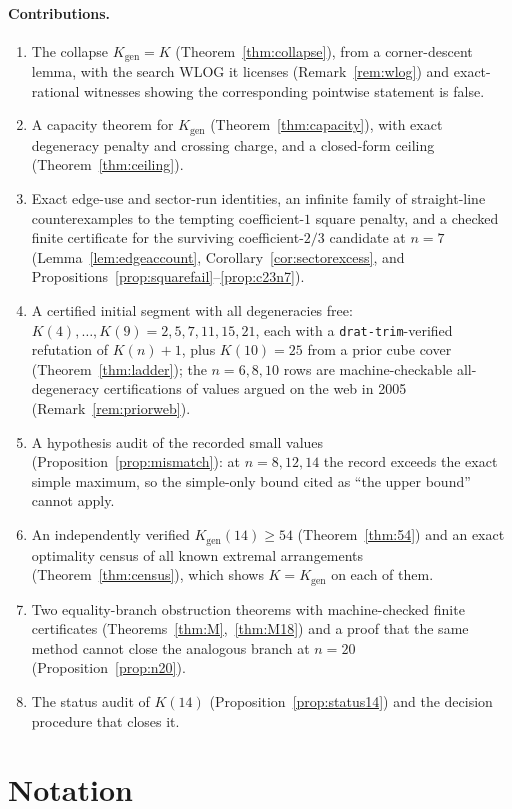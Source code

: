 \documentclass[11pt]{article}
\theoremstyle{definition}
\newcommand{\Kgen}{K_{\mathrm{gen}}}
\begin{document}
\paragraph{Contributions.}
\begin{enumerate}
\item The collapse $\Kgen=K$ (Theorem~\ref{thm:collapse}), from a
corner-descent lemma, with the search WLOG it licenses
(Remark~\ref{rem:wlog}) and exact-rational witnesses showing the
corresponding pointwise statement is false.
\item A capacity theorem for $\Kgen$ (Theorem~\ref{thm:capacity}), with exact
degeneracy penalty and crossing charge, and a closed-form ceiling
(Theorem~\ref{thm:ceiling}).
\item Exact edge-use and sector-run identities, an infinite family of
straight-line counterexamples to the tempting coefficient-$1$ square penalty,
and a checked finite certificate for the surviving coefficient-$2/3$
candidate at $n=7$ (Lemma~\ref{lem:edgeaccount},
Corollary~\ref{cor:sectorexcess}, and
Propositions~\ref{prop:squarefail}--\ref{prop:c23n7}).
\item A certified initial segment with all degeneracies free:
$K(4),\dots,K(9)=2,5,7,11,15,21$, each with a \texttt{drat-trim}-verified
refutation of $K(n)+1$, plus $K(10)=25$ from a prior cube cover
(Theorem~\ref{thm:ladder}); the $n=6,8,10$ rows are machine-checkable
all-degeneracy certifications of values argued on the web in 2005
(Remark~\ref{rem:priorweb}).
\item A hypothesis audit of the recorded small values
(Proposition~\ref{prop:mismatch}): at $n=8,12,14$ the record exceeds the
exact simple maximum, so the simple-only bound cited as ``the upper bound''
cannot apply.
\item An independently verified $\Kgen(14)\ge54$ (Theorem~\ref{thm:54}) and
an exact optimality census of all known extremal arrangements
(Theorem~\ref{thm:census}), which shows $K=\Kgen$ on each of them.
\item Two equality-branch obstruction theorems with machine-checked finite
certificates (Theorems~\ref{thm:M},~\ref{thm:M18}) and a proof that the same
method cannot close the analogous branch at $n=20$
(Proposition~\ref{prop:n20}).
\item The status audit of $K(14)$ (Proposition~\ref{prop:status14}) and the
decision procedure that closes it.
\end{enumerate}

\section{Notation}
\end{document}
